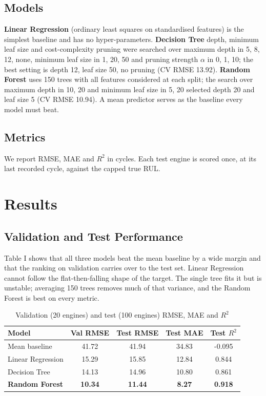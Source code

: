 \documentclass[conference]{IEEEtran}
\begin{document}
\subsection{Models}
\textbf{Linear Regression} (ordinary least squares on standardised features) is the simplest baseline and has no hyper-parameters. \textbf{Decision Tree} depth, minimum leaf size and cost-complexity pruning were searched over maximum depth in {5, 8, 12, none}, minimum leaf size in {1, 20, 50} and pruning strength $\alpha$ in {0, 1, 10}; the best setting is depth 12, leaf size 50, no pruning (CV RMSE 13.92). \textbf{Random Forest} uses 150 trees with all features considered at each split; the search over maximum depth in {10, 20} and minimum leaf size in {5, 20} selected depth 20 and leaf size 5 (CV RMSE 10.94). A mean predictor serves as the baseline every model must beat.

\subsection{Metrics}
We report RMSE, MAE and $R^2$ in cycles. Each test engine is scored once, at its last recorded cycle, against the capped true RUL.


\section{Results}
\subsection{Validation and Test Performance}
Table I shows that all three models beat the mean baseline by a wide margin and that the ranking on validation carries over to the test set. Linear Regression cannot follow the flat-then-falling shape of the target. The single tree fits it but is unstable; averaging 150 trees removes much of that variance, and the Random Forest is best on every metric.

\begin{table}[!t]
\caption{Validation (20 engines) and test (100 engines) RMSE, MAE and $R^2$}
\label{tabI}
\centering
\footnotesize
\begin{tabular}{lcccc}
\toprule
Model & Val RMSE & Test RMSE & Test MAE & Test $R^2$ \\
\midrule
Mean baseline & 41.72 & 41.94 & 34.83 & -0.095 \\
Linear Regression & 15.29 & 15.85 & 12.84 & 0.844 \\
Decision Tree & 14.13 & 14.96 & 10.80 & 0.861 \\
\textbf{Random Forest} & \textbf{10.34} & \textbf{11.44} & \textbf{8.27} & \textbf{0.918} \\
\bottomrule
\end{tabular}
\end{table}
\end{document}
